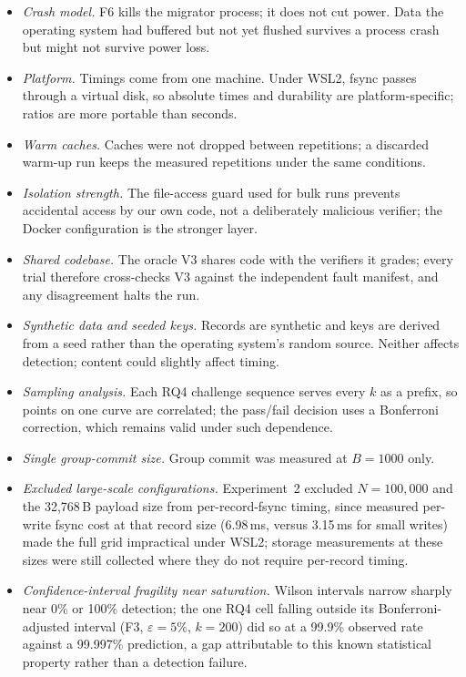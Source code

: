 \begin{itemize}
  \item \emph{Crash model.} F6 kills the migrator process; it does not cut power. Data the operating system
        had buffered but not yet flushed survives a process crash but might not survive power loss.
  \item \emph{Platform.} Timings come from one machine. Under WSL2, fsync passes through a virtual disk, so
        absolute times and durability are platform-specific; ratios are more portable than seconds.
  \item \emph{Warm caches.} Caches were not dropped between repetitions; a discarded warm-up run keeps the
        measured repetitions under the same conditions.
  \item \emph{Isolation strength.} The file-access guard used for bulk runs prevents accidental access by our
        own code, not a deliberately malicious verifier; the Docker configuration is the stronger layer.
  \item \emph{Shared codebase.} The oracle V3 shares code with the verifiers it grades; every trial therefore
        cross-checks V3 against the independent fault manifest, and any disagreement halts the run.
  \item \emph{Synthetic data and seeded keys.} Records are synthetic and keys are derived from a seed rather
        than the operating system's random source. Neither affects detection; content could slightly
        affect timing.
  \item \emph{Sampling analysis.} Each RQ4 challenge sequence serves every $k$ as a prefix, so points on one
        curve are correlated; the pass/fail decision uses a Bonferroni correction, which remains valid
        under such dependence.
  \item \emph{Single group-commit size.} Group commit was measured at $B=1000$ only.
  \item \emph{Excluded large-scale configurations.} Experiment~2 excluded $N=100{,}000$ and the 32{,}768\,B
        payload size from per-record-fsync timing, since measured per-write fsync cost at that record size
        (6.98\,ms, versus 3.15\,ms for small writes) made the full grid impractical under WSL2; storage
        measurements at these sizes were still collected where they do not require per-record timing.
  \item \emph{Confidence-interval fragility near saturation.} Wilson intervals narrow sharply near 0\% or
        100\% detection; the one RQ4 cell falling outside its Bonferroni-adjusted interval (F3,
        $\varepsilon=5\%$, $k=200$) did so at a 99.9\% observed rate against a 99.997\% prediction, a gap
        attributable to this known statistical property rather than a detection failure.
\end{itemize}

